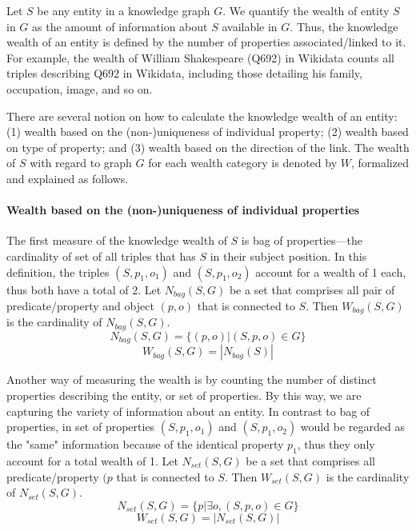 \documentclass[
]{ceurart}
\begin{document}
Let \(S\) be any entity in a knowledge graph \(G\). We quantify the wealth of entity \(S\) in \(G\) as the amount of information about \(S\) available in \(G\). Thus, the knowledge wealth of an entity is defined by the number of properties associated/linked to it. For example, the wealth of William Shakespeare (Q692) in Wikidata counts all triples describing Q692 in Wikidata, including those detailing his family, occupation, image, and so on.

There are several notion on how to calculate the knowledge wealth of an entity: (1) wealth based on the (non-)uniqueness of individual property; (2) wealth based on type of property; and (3) wealth based on the direction of the link. The wealth of \(S\) with regard to graph \(G\) for each wealth category is denoted by \(W\), formalized and explained as follows.

\paragraph{Wealth based on the (non-)uniqueness of individual properties}
The first measure of the knowledge wealth of \(S\) is bag of properties---the cardinality of set of all triples that has \(S\) in their subject position. In this definition, the triples \((S, p_1, o_1)\) and \((S, p_1, o_2)\) account for a wealth of 1 each, thus both have a total of 2.
Let \(N_{bag}(S,G)\) be a set that comprises all pair of predicate/property and object \((p,o)\) that is connected to \(S\). Then \(W_{bag}(S, G)\) is the cardinality of \(N_{bag}(S,G)\).
\[
    N_{bag}(S,G) = \{(p, o) | (S, p, o) ∈ G\}
\]
\[
    W_{bag}(S,G) = |N_{bag}(S)|
\]

Another way of measuring the wealth is by counting the number of distinct properties describing the entity, or set of properties. By this way, we are capturing the variety of information about an entity. In contrast to bag of properties, in set of properties \((S, p_1, o_1)\) and \((S, p_1, o_2)\) would be regarded as the "same" information because of the identical property \(p_1\), thus they only account for a total wealth of 1. Let \(N_{set}(S,G)\) be a set that comprises all predicate/property \((p\) that is connected to \(S\). Then \(W_{set}(S, G)\) is the cardinality of \(N_{set}(S,G)\).
\[
    N_{set}(S, G) = \{p | \exists o, (S, p, o) ∈ G\}
\]
\[
    W_{set}(S, G) = |N_{set}(S,G)|
\]
\end{document}

